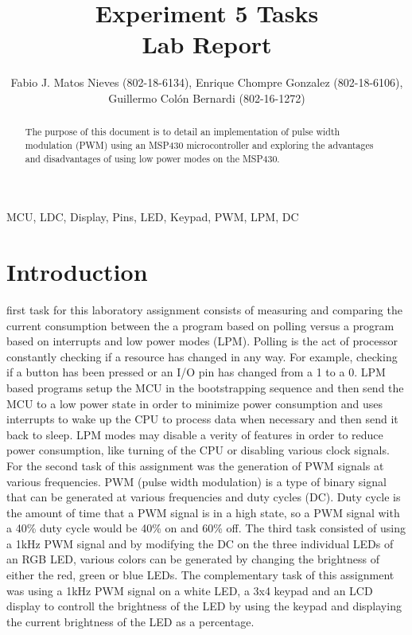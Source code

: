 \documentclass[journal]{IEEEtran}
\begin{document}
\title{Experiment 5 Tasks\\ Lab Report} \author{Fabio J. Matos
  Nieves (802-18-6134), Enrique Chompre Gonzalez (802-18-6106), \\Guillermo Colón Bernardi (802-16-1272)}
\maketitle
\begin{abstract}
  The purpose of this document is to detail an implementation of pulse width modulation (PWM) using an MSP430 microcontroller and exploring the advantages and disadvantages of using low power modes on the MSP430.
\end{abstract}
\begin{IEEEkeywords}
  MCU, LDC, Display, Pins, LED, Keypad, PWM, LPM, DC
\end{IEEEkeywords}
\IEEEpeerreviewmaketitle
\section{Introduction}
 first task for this laboratory assignment consists of measuring and comparing the current consumption between the a program based on polling versus a program based on interrupts and low power modes (LPM). Polling is the act of processor constantly checking if a resource has changed in any way. For example, checking if a button has been pressed or an I/O pin has changed from a 1 to a 0. LPM based programs setup the MCU in the bootstrapping sequence and then send the MCU to a low power state in order to minimize power consumption and uses interrupts to wake up the CPU to process data when necessary and then send it back to sleep. LPM modes may disable a verity of features in order to reduce power consumption, like turning of the CPU or disabling various clock signals. For the second task of this assignment was the generation of PWM signals at various frequencies. PWM (pulse width modulation) is a type of binary signal that can be generated at various frequencies and duty cycles (DC). Duty cycle is the amount of time that a PWM signal is in a high state, so a PWM signal with a 40\% duty cycle would be 40\% on and 60\% off. The third task consisted of using a 1\si{kHz} PWM signal and by modifying the DC on the three individual LEDs of an RGB LED, various colors can be generated by changing the brightness of either the red, green or blue LEDs. The complementary task of this assignment was using a 1\si{kHz} PWM signal on a white LED, a 3x4 keypad and an LCD display to controll the brightness of the LED by using the keypad and displaying the current brightness of the LED as a percentage.\\
\end{document}
